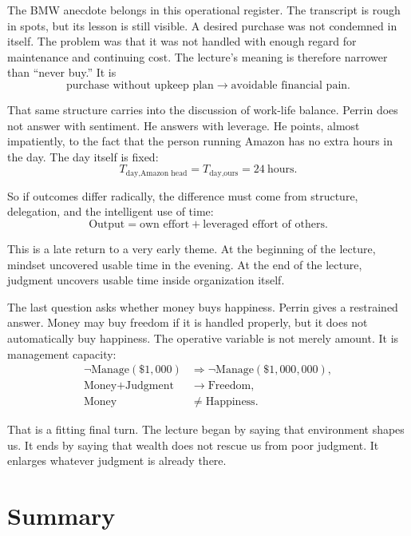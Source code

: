 The BMW anecdote belongs in this operational register. The transcript is rough in spots, but its lesson is still visible. A desired purchase was not condemned in itself. The problem was that it was not handled with enough regard for maintenance and continuing cost. The lecture's meaning is therefore narrower than ``never buy.'' It is
\begin{equation}
\text{purchase without upkeep plan} \to \text{avoidable financial pain}.
\end{equation}

That same structure carries into the discussion of work-life balance. Perrin does not answer with sentiment. He answers with leverage. He points, almost impatiently, to the fact that the person running Amazon has no extra hours in the day. The day itself is fixed:
\begin{equation}
T_{\text{day,Amazon head}} = T_{\text{day,ours}} = 24\ \text{hours}.
\end{equation}

So if outcomes differ radically, the difference must come from structure, delegation, and the intelligent use of time:
\begin{equation}
\text{Output}
=
\text{own effort}
+
\text{leveraged effort of others}.
\end{equation}

This is a late return to a very early theme. At the beginning of the lecture, mindset uncovered usable time in the evening. At the end of the lecture, judgment uncovers usable time inside organization itself.

The last question asks whether money buys happiness. Perrin gives a restrained answer. Money may buy freedom if it is handled properly, but it does not automatically buy happiness. The operative variable is not merely amount. It is management capacity:
\begin{align}
\neg \text{Manage}(\$1{,}000)
&\Longrightarrow
\neg \text{Manage}(\$1{,}000{,}000),\\
\text{Money} + \text{Judgment}
&\to
\text{Freedom},\\
\text{Money}
&\neq
\text{Happiness}.
\end{align}

That is a fitting final turn. The lecture began by saying that environment shapes us. It ends by saying that wealth does not rescue us from poor judgment. It enlarges whatever judgment is already there.

\section{Summary}

